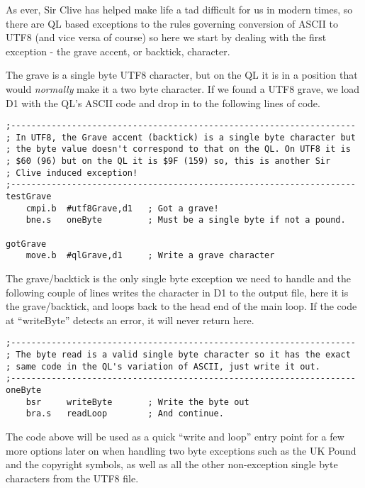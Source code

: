 As ever, Sir Clive has helped make life a tad difficult for us in
modern times, so there are QL based exceptions to the rules governing
conversion of ASCII to UTF8 (and vice versa of course) so here we
start by dealing with the first exception - the grave accent, or backtick,
character.

The grave is a single byte UTF8 character, but on the QL it is in
a position that would \emph{normally} make it a two byte character.
If we found a UTF8 grave, we load D1 with the QL's ASCII code and
drop in to the following lines of code.

\begin{lstlisting}[firstnumber=last,caption={Utf82Ql: Handling exceptions - the grave/backtick character}]
;--------------------------------------------------------------------
; In UTF8, the Grave accent (backtick) is a single byte character but
; the byte value doesn't correspond to that on the QL. On UTF8 it is
; $60 (96) but on the QL it is $9F (159) so, this is another Sir
; Clive induced exception!
;--------------------------------------------------------------------
testGrave
    cmpi.b  #utf8Grave,d1   ; Got a grave!
    bne.s   oneByte         ; Must be a single byte if not a pound.

gotGrave
    move.b  #qlGrave,d1     ; Write a grave character
\end{lstlisting}

The grave/backtick is the only single byte exception we need to handle
and the following couple of lines writes the character in D1 to the
output file, here it is the grave/backtick, and loops back to the
head end of the main loop. If the code at ``writeByte'' detects
an error, it will never return here.

\begin{lstlisting}[firstnumber=last,caption={Utf82Ql: Handling one byte UTF characters}]
;--------------------------------------------------------------------
; The byte read is a valid single byte character so it has the exact
; same code in the QL's variation of ASCII, just write it out.
;--------------------------------------------------------------------
oneByte
    bsr     writeByte       ; Write the byte out
    bra.s   readLoop        ; And continue.
\end{lstlisting}

The code above will be used as a quick ``write and loop'' entry
point for a few more options later on when handling two byte exceptions
such as the UK Pound and the copyright symbols, as well as all the
other non-exception single byte characters from the UTF8 file.

